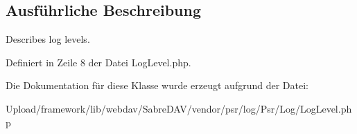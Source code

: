 \subsection{Ausführliche Beschreibung}
Describes log levels. 

Definiert in Zeile 8 der Datei Log\+Level.\+php.



Die Dokumentation für diese Klasse wurde erzeugt aufgrund der Datei\+:\begin{DoxyCompactItemize}
\item 
Upload/framework/lib/webdav/\+Sabre\+D\+A\+V/vendor/psr/log/\+Psr/\+Log/Log\+Level.\+php\end{DoxyCompactItemize}
